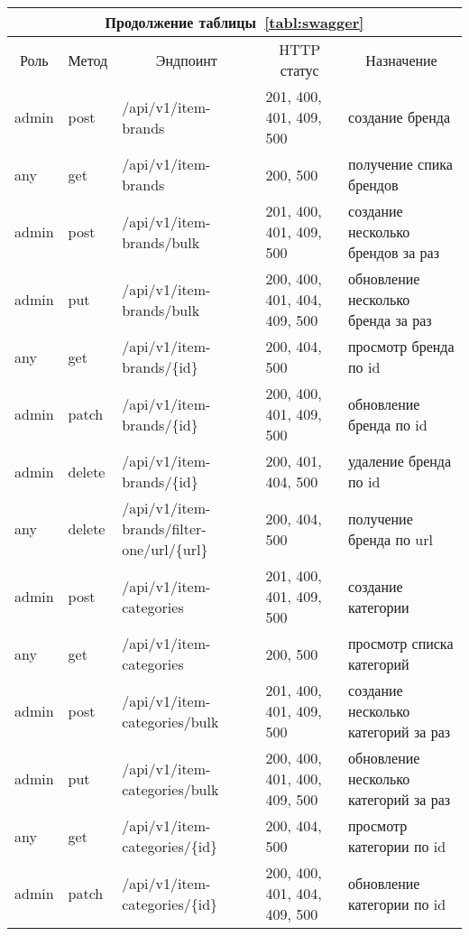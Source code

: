 \begin{sidewaystable}
    \small

    \begin{tabular}{|p{1cm}|p{1cm}|p{8.5cm}|p{4.8cm}|p{8cm}|}
        \multicolumn{5}{c}{Продолжение таблицы~\ref{tabl:swagger}} \\
        \hline
        \multicolumn{1}{|c|}{Роль}
        & \multicolumn{1}{c|}{Метод}
        & \multicolumn{1}{c|}{Эндпоинт}
        & \multicolumn{1}{c|}{HTTP статус}
        & \multicolumn{1}{c|}{Назначение}
        \\ \hline
        admin & post & /api/v1/item-brands & 201, 400, 401, 409, 500 & создание бренда \\ \hline 
        any & get & /api/v1/item-brands & 200, 500 & получение спика брендов \\ \hline  
        admin & post & /api/v1/item-brands/bulk & 201, 400, 401, 409, 500 & создание несколько брендов за раз \\ \hline 
        admin & put & /api/v1/item-brands/bulk & 200, 400, 401, 404, 409, 500 & обновление несколько бренда за раз \\ \hline
        any & get & /api/v1/item-brands/\{id\} & 200, 404, 500 & просмотр бренда по id \\ \hline 
        admin & patch & /api/v1/item-brands/\{id\} & 200, 400, 401, 409, 500 & обновление бренда по id \\ \hline 
        admin & delete & /api/v1/item-brands/\{id\} & 200, 401, 404, 500 & удаление бренда по id \\ \hline 
        any & delete & /api/v1/item-brands/filter-one/url/\{url\} & 200, 404, 500 & получение бренда по url \\ \hline 
        admin & post & /api/v1/item-categories & 201, 400, 401, 409, 500 & создание категории \\ \hline 
        any & get & /api/v1/item-categories & 200, 500 & просмотр списка категорий \\ \hline 
        admin & post & /api/v1/item-categories/bulk & 201, 400, 401, 409, 500 & создание несколько категорий за раз \\ \hline 
        admin & put & /api/v1/item-categories/bulk & 200, 400, 401, 400, 409, 500 & обновление несколько категорий за раз \\ \hline 
        any & get & /api/v1/item-categories/\{id\} & 200, 404, 500 & просмотр категории по id \\ \hline 
        admin & patch & /api/v1/item-categories/\{id\} & 200, 400, 401, 404, 409, 500 & обновление категории по id \\ \hline 

\end{tabular}
\end{sidewaystable}
